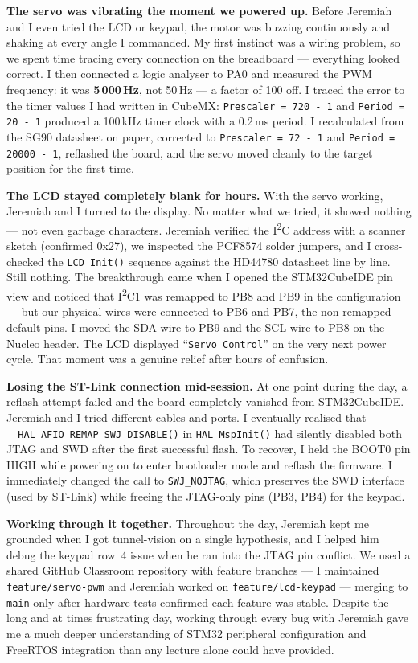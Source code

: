 \documentclass[11pt, a4paper]{article}
\begin{document}
\textbf{The servo was vibrating the moment we powered up.}
Before Jeremiah and I even tried the LCD or keypad, the motor was buzzing continuously
and shaking at every angle I commanded. My first instinct was a wiring problem, so we
spent time tracing every connection on the breadboard --- everything looked correct.
I then connected a logic analyser to PA0 and measured the PWM frequency: it was
\textbf{5\,000\,Hz}, not 50\,Hz --- a factor of 100 off. I traced the error to the timer
values I had written in CubeMX: \texttt{Prescaler = 720 - 1} and \texttt{Period = 20 - 1}
produced a 100\,kHz timer clock with a 0.2\,ms period. I recalculated from the SG90
datasheet on paper, corrected to \texttt{Prescaler = 72 - 1} and \texttt{Period = 20000 - 1},
reflashed the board, and the servo moved cleanly to the target position for the first time.

\textbf{The LCD stayed completely blank for hours.}
With the servo working, Jeremiah and I turned to the display. No matter what we tried,
it showed nothing --- not even garbage characters. Jeremiah verified the
I\textsuperscript{2}C address with a scanner sketch (confirmed 0x27), we inspected the
PCF8574 solder jumpers, and I cross-checked the \texttt{LCD\_Init()} sequence against the
HD44780 datasheet line by line. Still nothing. The breakthrough came when I opened the
STM32CubeIDE pin view and noticed that I\textsuperscript{2}C1 was remapped to PB8 and
PB9 in the configuration --- but our physical wires were connected to PB6 and PB7, the
non-remapped default pins. I moved the SDA wire to PB9 and the SCL wire to PB8 on the
Nucleo header. The LCD displayed ``\texttt{Servo Control}'' on the very next power cycle.
That moment was a genuine relief after hours of confusion.

\textbf{Losing the ST-Link connection mid-session.}
At one point during the day, a reflash attempt failed and the board completely vanished
from STM32CubeIDE. Jeremiah and I tried different cables and ports. I eventually realised
that \texttt{\_\_HAL\_AFIO\_REMAP\_SWJ\_DISABLE()} in \texttt{HAL\_MspInit()} had
silently disabled both JTAG and SWD after the first successful flash. To recover, I held
the BOOT0 pin HIGH while powering on to enter bootloader mode and reflash the firmware.
I immediately changed the call to \texttt{SWJ\_NOJTAG}, which preserves the SWD
interface (used by ST-Link) while freeing the JTAG-only pins (PB3, PB4) for the keypad.

\textbf{Working through it together.}
Throughout the day, Jeremiah kept me grounded when I got tunnel-vision on a single
hypothesis, and I helped him debug the keypad row~4 issue when he ran into the JTAG
pin conflict. We used a shared GitHub Classroom repository with feature branches ---
I maintained \texttt{feature/servo-pwm} and Jeremiah worked on \texttt{feature/lcd-keypad}
--- merging to \texttt{main} only after hardware tests confirmed each feature was stable.
Despite the long and at times frustrating day, working through every bug with Jeremiah
gave me a much deeper understanding of STM32 peripheral configuration and FreeRTOS
integration than any lecture alone could have provided.
\end{document}
